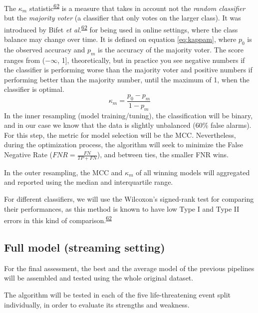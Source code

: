 \documentclass[12pt,twoside]{fmupthesis}
\begin{document}
The \(\kappa_m\) statistic\textsuperscript{\protect\hyperlink{ref-Bifet2015}{62}} is a measure that takes in account not the \emph{random classifier}
but the \emph{majority voter} (a classifier that only votes on the larger class). It was introduced by
Bifet \emph{et al.}\textsuperscript{\protect\hyperlink{ref-Bifet2015}{62}} for being used in online settings, where the class balance may change
over time. It is defined on equation \eqref{eq:kappam}, where \(p_0\) is the observed accuracy and
\(p_m\) is the accuracy of the majority voter. The score ranges from (\(-\infty\), 1{]}, theoretically,
but in practice you see negative numbers if the classifier is performing worse than the majority voter
and positive numbers if performing better than the majority number, until the maximum of 1, when the
classifier is optimal.
\begin{equation}
\kappa_m = \frac{p_0 - p_m}{1 - p_m} \label{eq:kappam}
\end{equation}
In the inner resampling (model training/tuning), the classification will be binary, and in our case
we know that the data is slightly unbalanced (60\% false alarms). For this step, the metric for model
selection will be the MCC. Nevertheless, during the optimization process, the algorithm will seek to
minimize the False Negative Rate (\(FNR = \frac{FN}{TP+FN}\)), and between ties, the smaller FNR wins.

In the outer resampling, the MCC and \(\kappa_m\) of all winning models will aggregated and reported
using the median and interquartile range.

For different classifiers, we will use the Wilcoxon's signed-rank test for comparing their performances,
as this method is known to have low Type I and Type II errors in this kind of comparison.\textsuperscript{\protect\hyperlink{ref-Bifet2015}{62}}

\hypertarget{full-model-streaming-setting}{%
\subsection{Full model (streaming setting)}\label{full-model-streaming-setting}}

For the final assessment, the best and the average model of the previous pipelines will be assembled
and tested using the whole original dataset.

The algorithm will be tested in each of the five life-threatening event split individually, in order
to evaluate its strengths and weakness.
\end{document}

